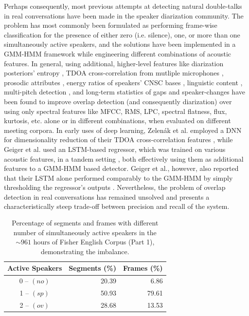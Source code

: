 \documentclass[a4paper]{article}
\begin{document}
Perhaps consequently, most previous attempts at detecting natural double-talks in real conversations
have been made in the speaker diarization community.
The problem has most commonly been formulated as performing frame-wise classification
for the presence of either
zero (i.e. silence), one, or more than one simultaneously active speakers,
and the solutions have been implemented in a GMM-HMM framework
while engineering different combinations of acoustic features.
In general, using additional, higher-level features like
diarization posteriors' entropy \cite{boakye_overlapped_2008},
TDOA cross-correlation from mutliple microphones \cite{zelenak_simultaneous_2012},
prosodic attributes \cite{zelenak_speaker_2012},
energy ratios of speakers' CNSC bases \cite{vipperla_speech_2012,geiger_speech_2012-1},
linguistic content \cite{GeigerUsinglinguisticinformation2013},
multi-pitch detection \cite{charlet_impact_2013},
and long-term statistics of gaps and speaker-changes \cite{yella_overlapping_2014}
have been found to improve overlap detection (and consequently diarization)
over using only spectral features like MFCC, RMS, LPC, spectral flatness, flux, kurtosis, etc.
alone or in different combinations, when evaluated on different meeting corpora.
In early uses of deep learning,
Zelen\'{a}k et al. employed a DNN for dimensionality reduction of their TDOA cross-correlation features \cite{zelenak_simultaneous_2012},
while Geiger et al. used an LSTM-based regressor,
which was trained on various acoustic features, in a tandem setting \cite{geiger_detecting_2013},
both effectively using them as additional features to a GMM-HMM based detector.
Geiger et al., however, also reported that their LSTM alone performed comparably to the GMM-HMM by simply thresholding the regressor's outputs \cite{geiger_detecting_2013}.
Nevertheless, the problem of overlap detection in real conversations has remained unsolved and
presents a characteristically steep trade-off between precision and recall of the system.

\begin{table}[t]
  \caption{Percentage of segments and frames with different number of simultaneously active speakers in the $\sim \!\!\! \text{961~hours}$ of Fisher English Corpus (Part 1), demonstrating the imbalance.}
  \centering
  \begin{tabular}{crr}
    \toprule
    \textbf{Active Speakers}  & \textbf{Segments (\%)}  & \textbf{Frames (\%)}  \\ \midrule
    0 -- $(no)$               & 20.39                   &  6.86                 \\
    1 -- $(sp)$               & 50.93                   & 79.61                 \\
    2 -- $(ov)$               & 28.68                   & 13.53                 \\
    \bottomrule
  \end{tabular}
  \label{tbl:actspk-perc}
  \vspace*{-\baselineskip}
\end{table}
\end{document}
